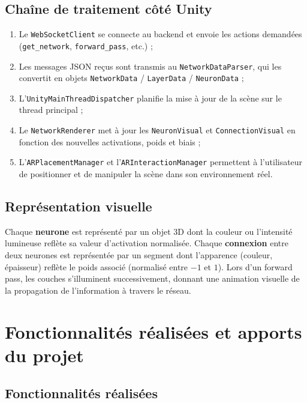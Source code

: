 \documentclass[12pt,a4paper]{report}
\begin{document}
\section{Cha\^ine de traitement c\^ot\'e Unity}

\begin{enumerate}
    \item Le \texttt{WebSocketClient} se connecte au backend et envoie les
    actions demand\'ees (\texttt{get\_network}, \texttt{forward\_pass}, etc.) ;
    \item Les messages JSON re\c{c}us sont transmis au
    \texttt{NetworkDataParser}, qui les convertit en objets
    \texttt{NetworkData} / \texttt{LayerData} / \texttt{NeuronData} ;
    \item L'\texttt{UnityMainThreadDispatcher} planifie la mise \`a jour de la
    sc\`ene sur le thread principal ;
    \item Le \texttt{NetworkRenderer} met \`a jour les \texttt{NeuronVisual}
    et \texttt{ConnectionVisual} en fonction des nouvelles activations,
    poids et biais ;
    \item L'\texttt{ARPlacementManager} et l'\texttt{ARInteractionManager}
    permettent \`a l'utilisateur de positionner et de manipuler la sc\`ene
    dans son environnement r\'eel.
\end{enumerate}

\section{Repr\'esentation visuelle}

Chaque \textbf{neurone} est repr\'esent\'e par un objet 3D dont la couleur ou
l'intensit\'e lumineuse refl\`ete sa valeur d'activation normalis\'ee.
Chaque \textbf{connexion} entre deux neurones est repr\'esent\'ee par un
segment dont l'apparence (couleur, \'epaisseur) refl\`ete le poids associ\'e
(normalis\'e entre $-1$ et $1$). Lors d'un forward pass, les couches
s'illuminent successivement, donnant une animation visuelle de la
propagation de l'information \`a travers le r\'eseau.


\chapter{Fonctionnalit\'es r\'ealis\'ees et apports du projet}
\label{chap:resultats}

\section{Fonctionnalit\'es r\'ealis\'ees}
\end{document}
